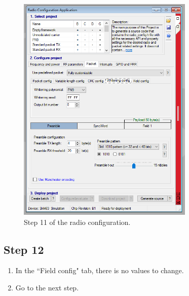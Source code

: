 \documentclass[12pt]{book}
\begin{document}
\begin{appendices}
\begin{figure}[!h]
	\begin{center}
		\includegraphics[width=0.75\textwidth]{figures/wds-tutorial-11.png}
		\caption{Step 11 of the radio configuration.}
		\label{fig:wds-tutorial-step-11}
	\end{center}
\end{figure}

\subsection{Step 12}

\begin{enumerate}
    \item In the ``Field config" tab, there is no values to change.
    \item Go to the next step.
\end{enumerate}


\end{appendices}
\end{document}
